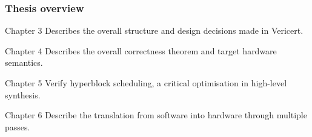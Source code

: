 \documentclass[svgnames,compress,12pt,aspectratio=169]{beamer}
\begin{document}
\begin{frame}
  \frametitle{Thesis overview}

  \begin{block}{Chapter 3}
    Describes the overall structure and design decisions made in Vericert.
  \end{block}

  \begin{block}{Chapter 4}
    Describes the overall correctness theorem and target hardware semantics.
  \end{block}

  \begin{block}{Chapter 5}
    Verify hyperblock scheduling, a critical optimisation in high-level synthesis.
  \end{block}

  \begin{block}{Chapter 6}
    Describe the translation from software into hardware through multiple passes.
  \end{block}
\end{frame}
\end{document}

